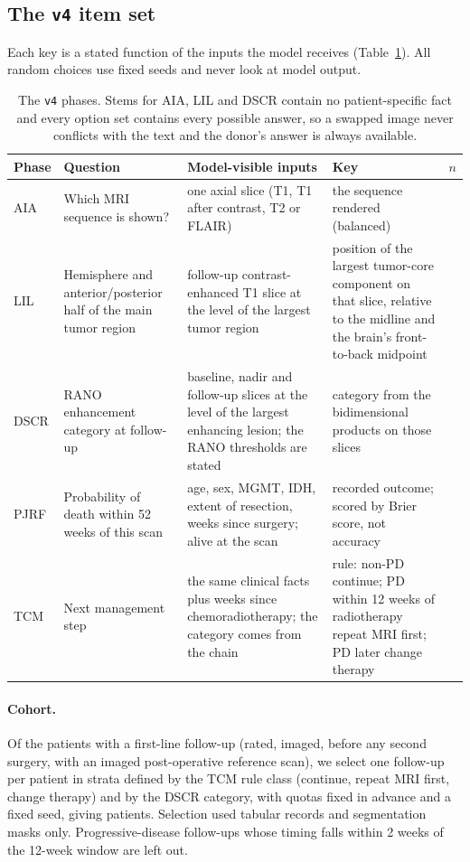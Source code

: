\documentclass[11pt]{article}
\begin{document}
\subsection{The \texttt{v4} item set}
\label{sec:v4}

Each key is a stated function of the inputs the model receives (Table~\ref{tab:phases}). All random choices use fixed seeds and never look at model output.

\begin{table}[t]
\centering
\footnotesize
\setlength{\tabcolsep}{3pt}
\begin{tabular}{p{0.7cm}p{4.6cm}p{4.4cm}p{4.4cm}r}
\toprule
Phase & Question & Model-visible inputs & Key & $n$ \\
\midrule
AIA & Which MRI sequence is shown? & one axial slice (T1, T1 after contrast, T2 or FLAIR) & the sequence rendered (balanced) & \vfourNAIA{} \\
LIL & Hemisphere and anterior/posterior half of the main tumor region & follow-up contrast-enhanced T1 slice at the level of the largest tumor region & position of the largest tumor-core component on that slice, relative to the midline and the brain's front-to-back midpoint & \vfourNLIL{} \\
DSCR & RANO enhancement category at follow-up & baseline, nadir and follow-up slices at the level of the largest enhancing lesion; the RANO thresholds are stated & category from the bidimensional products on those slices & \vfourNDSCR{} \\
PJRF & Probability of death within 52 weeks of this scan & age, sex, MGMT, IDH, extent of resection, weeks since surgery; alive at the scan & recorded outcome; scored by Brier score, not accuracy & \vfourNPJRF{} \\
TCM & Next management step & the same clinical facts plus weeks since chemoradiotherapy; the category comes from the chain & rule: non-PD continue; PD within 12 weeks of radiotherapy repeat MRI first; PD later change therapy & \vfourNTCM{} \\
\bottomrule
\end{tabular}
\caption{The \texttt{v4} phases. Stems for AIA, LIL and DSCR contain no patient-specific fact and every option set contains every possible answer, so a swapped image never conflicts with the text and the donor's answer is always available.}
\label{tab:phases}
\end{table}

\paragraph{Cohort.} Of the patients with a first-line follow-up (rated, imaged, before any second surgery, with an imaged post-operative reference scan), we select one follow-up per patient in strata defined by the TCM rule class (continue, repeat MRI first, change therapy) and by the DSCR category, with quotas fixed in advance and a fixed seed, giving \vfourPatients{} patients. Selection used tabular records and segmentation masks only. Progressive-disease follow-ups whose timing falls within 2 weeks of the 12-week window are left out.
\end{document}
